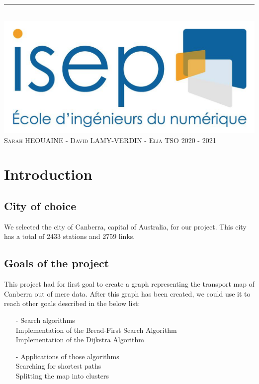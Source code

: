 \documentclass{article}
\begin{document}
\begin{titlepage}
\begin{center}
		\rule{16cm}{0.4pt} \\
		\vspace{5mm}
		\includegraphics[scale=0.20]{assets/logoISEP} \\
		\textsc{\large Sarah HEOUAINE - David LAMY-VERDIN - Elia TSO}
		\medbreak
		\textsc{\large 2020 - 2021}
	\end{center}
\end{titlepage}

\renewcommand{\contentsname}{Table of contents}
\tableofcontents
\cleardoublepage

\section{Introduction}

\subsection{City of choice}

	We selected the city of Canberra, capital of Australia, for our project. This city has a total of 2433 stations and 2759 links.
	
\subsection{Goals of the project}

	This project had for first goal to create a graph representing the transport map of Canberra out of mere data. After this graph has been created, we could use it to reach other goals described in the below list:
	
\begin{itemize}
\item[-] Search algorithms \\
Implementation of the Bread-First Search Algorithm \\
Implementation of the Dijkstra Algorithm
\medbreak
\item[-] Applications of those algorithms \\
Searching for shortest paths \\
Splitting the map into clusters
\end{itemize}
\end{document}
